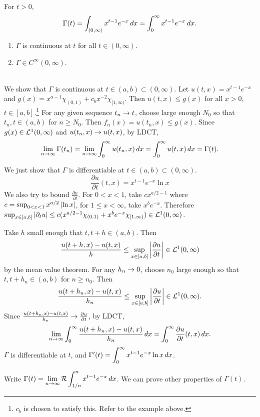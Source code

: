 \pagebreak

\recall {} For \(t > 0\),
\[
    \Gamma(t) = \int_{(0, \infty)} x^{t-1} e^{-x} \,d{x} = \int_0^\infty x^{t-1} e^{-x} \,d{x}.
\]
\begin{enumerate}
    \item \(\Gamma\) is continuous at \(t\) for all \(t \in (0, \infty)\).
    \item \(\Gamma \in C^\infty(0, \infty)\).
\end{enumerate}

\pf \\
 We show that \(\Gamma\) is continuous at \(t \in (a, b) \subset (0, \infty)\). Let \(u(t, x) = x^{t-1}e^{-x}\) and \(g(x) = x^{a - 1} \chi_{(0, 1)} + c_b x^{-2} \chi_{[1, \infty)}\). Then \(u(t, x) \leq g(x)\) for all \(x > 0\), \(t \in [a, b]\).\footnote{\(c_b\) is chosen to satisfy this. Refer to the example above.} For any given sequence \(t_n \rightarrow t\), choose large enough \(N_0\) so that \(t_n, t \in (a, b)\) for \(n\geq N_0\). Then \(f_n(x) = u(t_n, x) \leq g(x)\). Since \(g(x) \in \mathcal{L}^{1}(0, \infty)\) and \(u(t_n, x) \rightarrow u(t, x)\), by LDCT,
\[
    \lim_{n \rightarrow \infty} \Gamma(t_n) = \lim_{n \rightarrow \infty} \int_{0}^{\infty} u(t_n, x) \,d{x} = \int_0^\infty u(t, x) \,d{x} = \Gamma(t).
\]

 We just show that \(\Gamma\) is differentiable at \(t \in (a, b) \subset (0, \infty)\).
\[
    \frac{\partial u}{\partial t}(t, x) = x^{t-1} e^{-x} \ln x
\]
We also try to bound \(\frac{\partial u}{\partial t}\). For \(0 < x < 1\), take \(c x^{a/2-1}\) where \(c = \sup_{0<x<1} x^{a/2} \left| \ln x \right|\), for \(1 \leq x < \infty\), take \(x^b e^{-x}\). Therefore \(\sup_{x \in [a, b]} \left| \partial_t u \right| \leq c(x^{a/2 -1} \chi_{(0, 1)} + x^be^{-x} \chi_{[1, \infty)}) \in \mathcal{L}^{1}(0, \infty)\).

Take \(h\) small enough that \(t, t+h \in (a, b)\). Then
\[
    \frac{u(t+h, x) - u(t, x)}{h} \leq \sup_{x \in [a, b]} \left| \frac{\partial u}{\partial t} \right| \in \mathcal{L}^{1}(0, \infty)
\]
by the mean value theorem. For any \(h_n \rightarrow 0\), choose \(n_0\) large enough so that \(t, t + h_n \in (a, b)\) for \(n \geq n_0\). Then
\[
    \frac{u(t+h_n, x) - u(t, x)}{h_n} \leq \sup_{x \in [a, b]} \left| \frac{\partial u}{\partial t} \right| \in \mathcal{L}^{1}(0, \infty).
\]
Since \(\frac{u(t+h_n, x) - u(t, x)}{h_n} \rightarrow \frac{\partial u}{\partial t}\), by LDCT,
\[
    \lim_{n \rightarrow \infty}\int_0^\infty \frac{u(t+h_n, x) - u(t, x)}{h_n} \,d{x} = \int_0^\infty \frac{\partial u}{\partial t}(t, x) \,d{x}.
\]
\(\Gamma\) is differentiable at \(t\), and \(\Gamma'(t) = \displaystyle\int_0^\infty x^{t-1} e^{-x} \ln x \,d{x}\).

\rmk Write \(\displaystyle \Gamma(t) = \lim_{n \rightarrow \infty} \mathcal{R} \int_{1/n}^{n} x^{t-1}e^{-x} \,d{x}\). We can prove other properties of \(\Gamma(t)\).

\pagebreak
